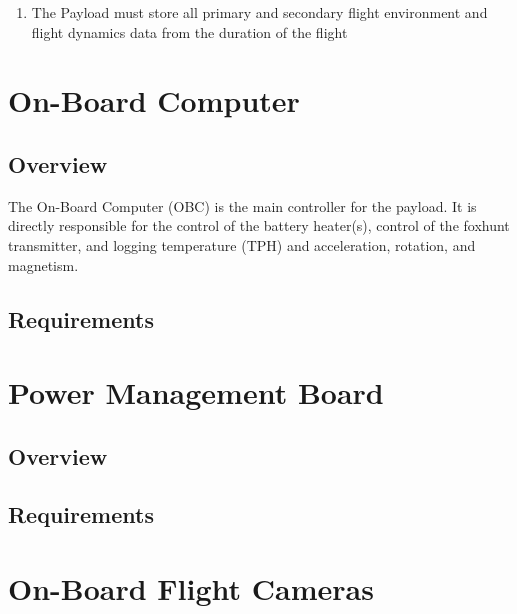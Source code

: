 \documentclass{article}
\begin{document}
\begin{enumerate}
\begin{enumerate}
            \item All cameras must be capable of reliably operating with an external Payload ambient temperature of $-70\degree$
            \item Collectively, all cameras should cover the following angles
                \begin{enumerate}
                    \item Vertically to capture the balloon
                    \item Vertically to capture the earth
                    \item Horizontally to capture the horizon
                \end{enumerate}
        \end{enumerate}
    \item The Payload must store all primary and secondary flight environment and flight dynamics data from the duration of the flight
\end{enumerate}

\section{On-Board Computer}
\subsection{Overview}
The On-Board Computer (OBC) is the main controller for the payload. It is directly responsible for the control of the battery heater(s), control of the foxhunt transmitter, and logging temperature (TPH) and acceleration, rotation, and magnetism.

\subsection{Requirements}

\section{Power Management Board}
\subsection{Overview}
\subsection{Requirements}

\section{On-Board Flight Cameras}
\end{document}
